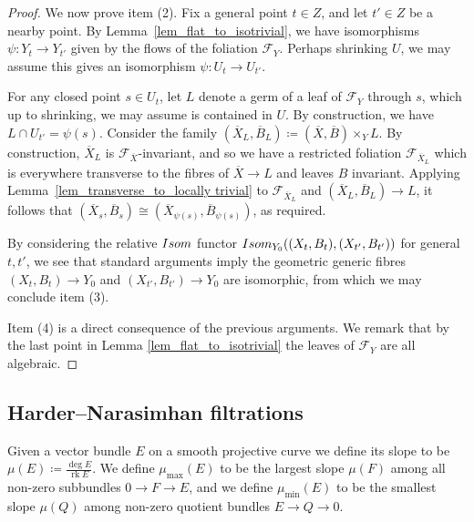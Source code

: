 \documentclass[12pt]{amsart}
\theoremstyle{plain}
\theoremstyle{definition}
\def\deg#1.{\operatorname {deg } (#1)}
\def\deg{\operatorname{deg}}
\def\rk{\operatorname{rk}}
\begin{document}
\begin{proof}
We now prove item (2).
Fix a general point $t \in Z$,
and let $t' \in Z$ be a nearby point.  
By Lemma~\ref{lem_flat_to_isotrivial}, we have isomorphisms $\psi\colon Y_t \rightarrow  Y_{t'}$ 
given by the flows of the foliation $\mathcal F_Y$. 
Perhaps shrinking $U$, we may assume this gives an isomorphism $\psi\colon U_t \rightarrow U_{t'}$.

For any closed point $s \in U_t$, let $L$ denote a germ of a leaf of $\mathcal F_Y$ through $s$, 
which up to shrinking, we may assume is contained in $U$.
By construction, we have $L \cap U_{t'} = \psi(s)$.
Consider the family $(\overline{X}_L, \overline{B}_L) \coloneqq (\overline{X}, \overline{B}) \times_Y L$.  
By construction, $\overline{X}_L$ is $\mathcal F_{\overline{X}}$-invariant, and so we have a restricted foliation 
$\mathcal F_{\overline{X}_L}$ which
is everywhere transverse to the fibres of $\overline{X} \rightarrow L$ and leaves $B$ invariant.  
Applying Lemma~\ref{lem_transverse_to_locally trivial} to $\mathcal F_{\overline{X}_L}$ 
and $(\overline{X}_L, \overline{B}_L) \rightarrow L$, 
it follows that $(\overline{X}_s, \overline{B}_s) \cong (\overline{X}_{\psi(s)}, \overline{B}_{\psi(s)})$, as required.

By considering the relative ${\rm Isom}$ functor ${\rm Isom}_{Y_0}((X_{t}, B_{t}), (X_{t'}, B_{t'}))$
for general $t, t'$,
we see that standard arguments imply 
the geometric generic fibres $(X_t, B_t) \rightarrow Y_0$  and $(X_{t'}, B_{t'}) \rightarrow Y_0$  are isomorphic, from which we may conclude 
item (3).

Item (4) is a direct consequence of the previous arguments.  We remark that by the last point in  
Lemma \ref{lem_flat_to_isotrivial} the leaves of $\mathcal F_Y$ are all algebraic.
\end{proof}












\subsection{Harder--Narasimhan filtrations}

\label{s_HN}

Given a vector bundle $E$ on a smooth projective curve we define its slope to be
$\mu(E) \coloneqq \frac{\deg E}{\rk E}$.
We define $\mu_{\max}(E)$ to be the largest slope $\mu(F)$ among all non-zero
 subbundles $0 \rightarrow F \rightarrow E$,
and we define $\mu_{\min}(E)$ to be the smallest slope $\mu(Q)$ among non-zero quotient bundles $E \rightarrow Q \rightarrow 0$.
\end{document}
